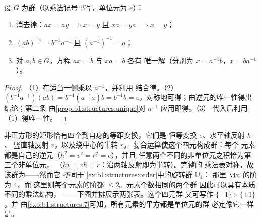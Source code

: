\begin{proposition}[运算规则]\label{prop:b1:structures:rules}
设 $G$ 为群（以乘法记号书写，单位元为 $e$）：
\begin{enumerate}
  \item 消去律：$ax = ay \implies x = y$ 且 $xa = ya \implies
        x = y$；
  \item $(ab)^{-1} = b^{-1} a^{-1}$ 且 $(a^{-1})^{-1} = a$；
  \item 对 $a, b \in G$，方程 $ax = b$ 与 $xa = b$ 各有
        唯一解（分别为 $x = a^{-1}b$，$x = b a^{-1}$）。
\end{enumerate}
\end{proposition}

\begin{proof}
（1）在适当一侧乘以 $a^{-1}$，并利用
结合律。（2）$(b^{-1}a^{-1})(ab) = b^{-1}(a^{-1}a)b = b^{-1}b =
e$，对称地可得；由逆元的唯一性得出结论；第二条
由\cref{prop:b1:structures:unique}对 $a^{-1}$ 应用即得。（3）
代入后利用（1）得唯一性。
\end{proof}

\begin{example}[矩形的对称性]\label{ex:b1:structures:klein}
非正方形的矩形恰有四个到自身的等距变换，它们是
恒等变换 $e$、水平轴反射 $h$、
竖直轴反射 $v$，以及绕中心的半转 $r$。
复合运算使这个四元构成群：每个
元素都是自己的逆元（$h^2 = v^2 = r^2 = e$），并且
任意两个不同的非单位元之积恰为第三个非单位元，
（$hv = vh = r$：沿两轴反射即为半转）。完整的
乘法表对称，故该群为——然而它
\emph{不}同于 \cref{ex:b1:structures:order}中的旋转群 $\mathbb U_4$：
那里 $\iu$ 的阶为 $4$，而
这里则每个元素的阶都 $\leq 2$。元素个数相同的两个群
因此可以具有本质不同的乘法结构，
——下图并排展示两张表。这个四元群
又可写作 $\{\pm1\} \times \{\pm1\}$，并
由\cref{exo:b1:structures:7}可知，所有元素的平方都是单位元的群
必定像它一样是。
\end{example}

